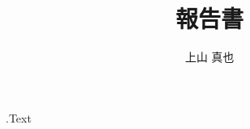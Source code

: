 \documentclass[11pt]{jarticle}
\title{報告書}
\author{上山 真也}
\begin{document}
\maketitle

{{.Text}}

\begin{thebibliography}{9}
        \bibitem{}
\end{thebibliography}
\end{document}
